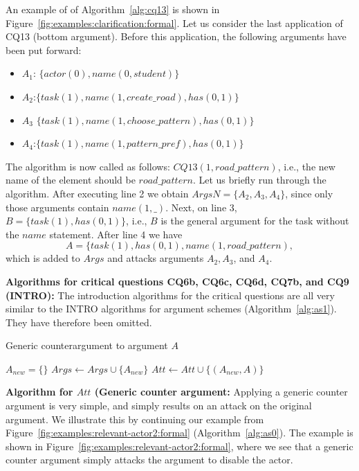 An example of of Algorithm~\ref{alg:cq13} is shown in Figure~\ref{fig:examples:clarification:formal}. Let us consider the last application of CQ13 (bottom argument). Before this application, the following arguments have been put forward:
\begin{itemize}
\item $A_1$: $\{actor(0),name(0,student)\}$
\item $A_2$:$\{task(1),name(1,create\_road),has(0,1)\}$
\item $A_3$ $\{task(1),name(1,choose\_pattern),has(0,1)\}$
\item $A_4$:$\{task(1),name(1,pattern\_pref),has(0,1)\}$
\end{itemize}
The algorithm is now called as follows: $CQ13(1,road\_pattern)$, i.e., the new name of the element should be $road\_pattern$. Let us briefly run through the algorithm. After executing line 2 we obtain $ArgsN=\{A_2,A_3,A_4\}$, since only those arguments contain $name(1,\_)$. Next, on line 3, $B=\{task(1),has(0,1)\}$, i.e., $B$ is the general argument for the task without the $name$ statement. After line 4 we have $$A=\{task(1),has(0,1),name(1,road\_pattern),$$ which is added to $Args$ and attacks arguments $A_2,A_3$, and $A_4$. 

\noindent\textbf{Algorithms for critical questions CQ6b, CQ6c, CQ6d, CQ7b, and CQ9 (INTRO):} The introduction algorithms for the critical questions are all very similar to the INTRO algorithms for argument schemes (Algorithm~\ref{alg:as1}). They have therefore been omitted.

\begin{algorithm}[h]
  \caption{Generic counterargument to argument $A$}\label{alg:cq6b}
  \begin{algorithmic}[1]
    \State $A_{new} = \{\}$
    \State $Args \gets Args \cup \{A_{new}\}$
    \State $Att \gets Att \cup \{(A_{new},A)\}$
    \EndProcedure
  \end{algorithmic}
\end{algorithm}

\noindent\textbf{Algorithm for $Att$ (Generic counter argument:} Applying a generic counter argument is very simple, and simply results on an attack on the original argument. We illustrate this by continuing our example from Figure~\ref{fig:examples:relevant-actor2:formal} (Algorithm~\ref{alg:as0}). The example is shown in Figure~\ref{fig:examples:relevant-actor2:formal}, where we see that a generic counter argument simply attacks the argument to disable the actor.

